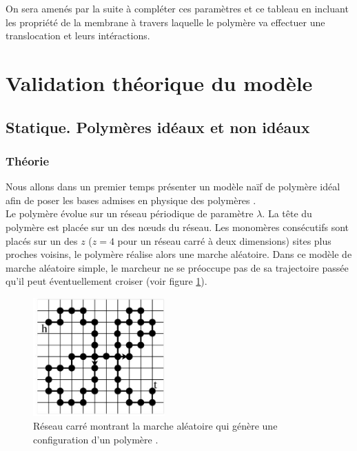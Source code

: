 
On sera amenés par la suite à compléter ces paramètres et ce tableau en incluant les propriété de la membrane à travers laquelle le polymère va effectuer une translocation et leurs intéractions.

\section{Validation théorique du modèle}

\subsection{Statique. Polymères idéaux et non idéaux}

\subsubsection{Théorie}
Nous allons dans un premier temps présenter un modèle naïf de polymère idéal afin de poser les bases admises en physique des polymères \cite{sung,these}.\\

Le polymère évolue sur un réseau périodique de paramètre $\lambda$. La tête du polymère est placée sur un des nœuds du réseau. Les monomères consécutifs sont placés sur un des $z$ ($z=4$ pour un réseau carré à deux dimensions) sites plus proches voisins, le polymère réalise alors une marche aléatoire. Dans ce modèle de marche aléatoire simple, le marcheur ne se préoccupe pas de sa trajectoire passée qu'il peut éventuellement croiser (voir figure \ref{resideal}).

\begin{figure}[H]
\begin{center}
\includegraphics[width=0.45\textwidth]{resideal.jpg}

\caption[Marche aléatoire sur réseau]{Réseau carré montrant la marche aléatoire qui génère une configuration d'un polymère \cite{these}.}
\label{resideal}
\end{center}
\end{figure}

